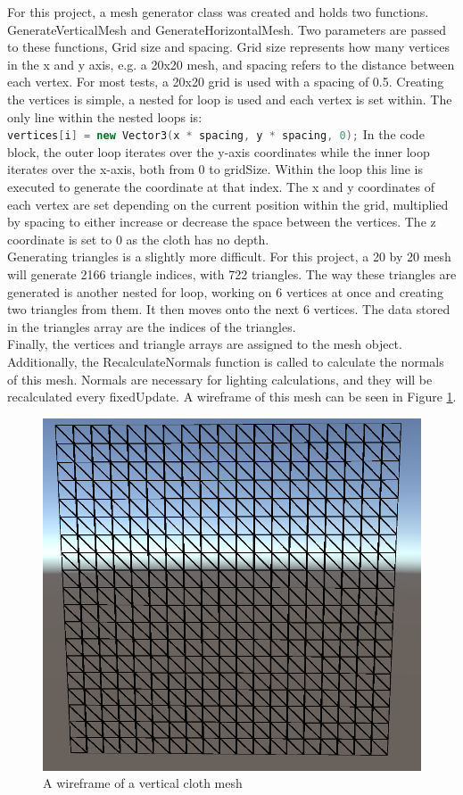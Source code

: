 \documentclass[12pt,a4paper]{article}
\begin{document}
For this project, a mesh generator class was created and holds two functions. GenerateVerticalMesh and GenerateHorizontalMesh. Two parameters are passed to these functions, Grid size and spacing. Grid size represents how many vertices in the x and y axis, e.g. a 20x20 mesh, and spacing refers to the distance between each vertex. For most tests, a 20x20 grid is used with a spacing of 0.5. Creating the vertices is simple, a nested for loop is used and each vertex is set within. The only line within the nested loops is:\\ \lstinline[language=C++]!vertices[i] = new Vector3(x * spacing, y * spacing, 0);!
In the code block, the outer loop iterates over the y-axis coordinates while the inner loop iterates over the x-axis, both from 0 to gridSize. Within the loop this line is executed to generate the coordinate at that index. The x and y coordinates of each vertex are set depending on the current position within the grid, multiplied by spacing to either increase or decrease the space between the vertices. The z coordinate is set to 0 as the cloth has no depth.\\

Generating triangles is a slightly more difficult. For this project, a 20 by 20 mesh will generate 2166 triangle indices, with 722 triangles. The way these triangles are generated is another nested for loop, working on 6 vertices at once and creating two triangles from them. It then moves onto the next 6 vertices. The data stored in the triangles array are the indices of the triangles. \\

Finally, the vertices and triangle arrays are assigned to the mesh object. Additionally, the RecalculateNormals function is called to calculate the normals of this mesh. Normals are necessary for lighting calculations, and they will be recalculated every fixedUpdate. A wireframe of this mesh can be seen in Figure \ref{fig:mesh}.
\begin{figure}
	\centering
	\includegraphics[scale=0.5]{clothmesh.png}
	\caption{A wireframe of a vertical cloth mesh}
	\label{fig:mesh}
\end{figure}
\end{document}
